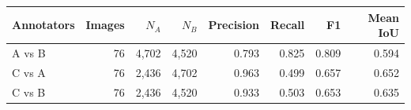 \begin{table}[t]
\centering
\begin{tabular}{lrrrrrrr}
\hline
Annotators & Images & $N_A$ & $N_B$ & Precision & Recall & F1 & Mean IoU \\
\hline
A vs B & 76 & 4,702 & 4,520 & 0.793 & 0.825 & 0.809 & 0.594 \\
C vs A & 76 & 2,436 & 4,702 & 0.963 & 0.499 & 0.657 & 0.652 \\
C vs B & 76 & 2,436 & 4,520 & 0.933 & 0.503 & 0.653 & 0.635 \\
\hline
\end{tabular}
\end{table}
